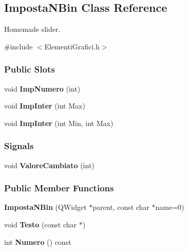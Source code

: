 \hypertarget{classImpostaNBin}{\subsection{\-Imposta\-N\-Bin \-Class \-Reference}
\label{classImpostaNBin}
}


\-Homemade slider.  




{\ttfamily \#include $<$\-Elementi\-Grafici.\-h$>$}

\subsubsection*{\-Public \-Slots}
\begin{DoxyCompactItemize}
\item 
\hypertarget{classImpostaNBin_a8061b6fff22eaa38700407bbf179a1ee}{void {\bfseries \-Imp\-Numero} (int)}\label{classImpostaNBin_a8061b6fff22eaa38700407bbf179a1ee}

\item 
\hypertarget{classImpostaNBin_afe52cab0e5d5fcb1ddddac6c1a10b38d}{void {\bfseries \-Imp\-Inter} (int \-Max)}\label{classImpostaNBin_afe52cab0e5d5fcb1ddddac6c1a10b38d}

\item 
\hypertarget{classImpostaNBin_a12904a8b0fbd7774c00bbcf44f6ff2f9}{void {\bfseries \-Imp\-Inter} (int \-Min, int \-Max)}\label{classImpostaNBin_a12904a8b0fbd7774c00bbcf44f6ff2f9}

\end{DoxyCompactItemize}
\subsubsection*{\-Signals}
\begin{DoxyCompactItemize}
\item 
\hypertarget{classImpostaNBin_ab1b323d7b5663b9acd07ac738d49f707}{void {\bfseries \-Valore\-Cambiato} (int)}\label{classImpostaNBin_ab1b323d7b5663b9acd07ac738d49f707}

\end{DoxyCompactItemize}
\subsubsection*{\-Public \-Member \-Functions}
\begin{DoxyCompactItemize}
\item 
\hypertarget{classImpostaNBin_a6b13f1131d1a02b8848404b52193f680}{{\bfseries \-Imposta\-N\-Bin} (\-Q\-Widget $\ast$parent, const char $\ast$name=0)}\label{classImpostaNBin_a6b13f1131d1a02b8848404b52193f680}

\item 
\hypertarget{classImpostaNBin_ad131323a76ebb0197218c09233f7359a}{void {\bfseries \-Testo} (const char $\ast$)}\label{classImpostaNBin_ad131323a76ebb0197218c09233f7359a}

\item 
\hypertarget{classImpostaNBin_ae1a67f98002156c9ae9130e248472cec}{int {\bfseries \-Numero} () const }\label{classImpostaNBin_ae1a67f98002156c9ae9130e248472cec}

\end{DoxyCompactItemize}


